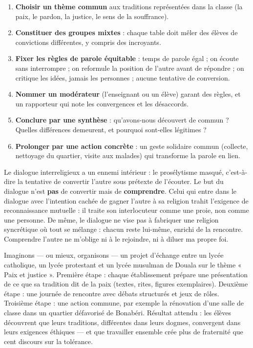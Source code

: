 \documentclass[11pt]{article}
\newcommand{\cle}[1]{{\popxbold\color{popdark}#1}}
\begin{document}
\begin{methode}
\begin{enumerate}
\item \textbf{Choisir un thème commun} aux traditions représentées dans la classe (la paix, le pardon, la justice, le sens de la souffrance).
\item \textbf{Constituer des groupes mixtes} : chaque table doit mêler des élèves de convictions différentes, y compris des incroyants.
\item \textbf{Fixer les règles de parole équitable} : temps de parole égal ; on écoute sans interrompre ; on reformule la position de l'autre avant de répondre ; on critique les idées, jamais les personnes ; aucune tentative de conversion.
\item \textbf{Nommer un modérateur} (l'enseignant ou un élève) garant des règles, et un rapporteur qui note les convergences et les désaccords.
\item \textbf{Conclure par une synthèse} : qu'avons-nous découvert de commun ? Quelles différences demeurent, et pourquoi sont-elles légitimes ?
\item \textbf{Prolonger par une action concrète} : un geste solidaire commun (collecte, nettoyage du quartier, visite aux malades) qui transforme la parole en lien.
\end{enumerate}
\end{methode}

\begin{attention}
Le dialogue interreligieux a un ennemi intérieur : le \cle{prosélytisme} masqué, c'est-à-dire la tentative de convertir l'autre sous prétexte de l'écouter. Le but du dialogue n'est \textbf{pas} de convertir mais de \textbf{comprendre}. Celui qui entre dans le dialogue avec l'intention cachée de gagner l'autre à sa religion trahit l'exigence de reconnaissance mutuelle : il traite son interlocuteur comme une proie, non comme une personne. De même, le dialogue ne vise pas à fabriquer une religion syncrétique où tout se mélange : chacun reste lui-même, enrichi de la rencontre. Comprendre l'autre ne m'oblige ni à le rejoindre, ni à diluer ma propre foi.
\end{attention}

\begin{exemplebox}
Imaginons — ou mieux, organisons — un projet d'échange entre un lycée catholique, un lycée protestant et un lycée musulman de Douala sur le thème « Paix et justice ». Première étape : chaque établissement prépare une présentation de ce que sa tradition dit de la paix (textes, rites, figures exemplaires). Deuxième étape : une journée de rencontre avec débats structurés et jeux de rôles. Troisième étape : une action commune, par exemple la rénovation d'une salle de classe dans un quartier défavorisé de Bonabéri. Résultat attendu : les élèves découvrent que leurs traditions, différentes dans leurs dogmes, convergent dans leurs exigences éthiques — et que travailler ensemble crée plus de fraternité que cent discours sur la tolérance.
\end{exemplebox}
\end{document}
